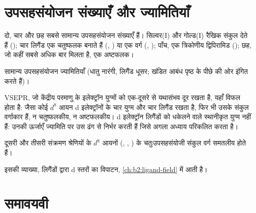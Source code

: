 \section{उपसहसंयोजन संख्याएँ और ज्यामितियाँ}

दो, चार और छह सबसे सामान्य उपसहसंयोजन संख्याएँ हैं। सिल्वर(I) और गोल्ड(I)
रैखिक संकुल देते हैं (\ce{[Ag(NH3)2]+}); चार लिगैंड एक चतुष्फलक बनाते हैं
(, ) या एक वर्ग (, );
पाँच, एक त्रिकोणीय द्विपिरामिड (); छह, जो कहीं सबसे अधिक बार मिलता है, एक
अष्टफलक।

\begin{omfigure}

{\small सामान्य उपसहसंयोजन ज्यामितियाँ (धातु नारंगी, लिगैंड धूसर; खंडित
आबंध पृष्ठ के पीछे की ओर इंगित करते हैं)।}
\end{omfigure}

VSEPR, जो केंद्रीय परमाणु के इलेक्ट्रॉन युग्मों को एक-दूसरे से यथासंभव दूर रखता है,
यहाँ विफल होता है:  जैसा कोई $d^8$ आयन d इलेक्ट्रॉनों के चार युग्म और चार
लिगैंड रखता है, फिर भी उसके संकुल वर्गाकार हैं, न चतुष्फलकीय, न अष्टफलकीय।
d इलेक्ट्रॉन लिगैंडों को धकेलने वाले स्थानीकृत युग्म नहीं हैं: उनकी ऊर्जाएँ
ज्यामिति पर उस ढंग से निर्भर करती हैं जिसे अगला अध्याय परिकलित करता है।

\begin{proposition}[वर्ग समतलीय $d^8$]\label{prop:b2:coordination-complexes:square-planar}
दूसरी और तीसरी संक्रमण श्रेणियों के $d^8$ आयनों (, , ) के
चतुःउपसहसंयोजी संकुल वर्ग समतलीय होते हैं।
\end{proposition}

\admitted

इसकी व्याख्या, लिगैंडों द्वारा d स्तरों का विपाटन, \cref{ch:b2:ligand-field}
में आती है।

\section{समावयवी}

